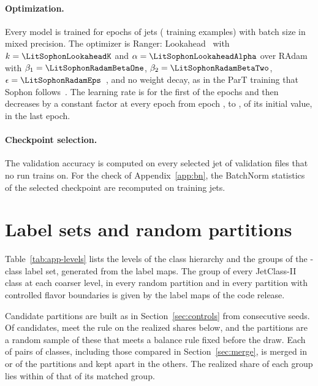 \documentclass[11pt]{article}
\newcommand{\Kcoarse}{\VocabSizeRonesixQone}
\begin{document}
\paragraph{Optimization.} Every model is trained for \DesignEpochs{} epochs of
\DesignSamplesPerEpoch{} jets (\DesignExamplesSeen{} training examples) with batch size
\DesignBatchSize{} in mixed precision. The optimizer is Ranger: Lookahead~\cite{lookahead}
with $k = \LitSophonLookaheadK$ and $\alpha = \LitSophonLookaheadAlpha$ over
RAdam~\cite{radam} with $\beta_1 = \LitSophonRadamBetaOne$,
$\beta_2 = \LitSophonRadamBetaTwo$, $\epsilon = \LitSophonRadamEps$~\cite[App.~B.1]{sophon}, and no
weight decay, as in the ParT training that Sophon follows~\cite{part}. The learning rate is \DesignStartLr{} for the first
\DesignLrFlatPercent{} of the epochs and then decreases by a constant factor at every epoch
from epoch \DesignLrDecayFirstEpoch, to \DesignEndLr, \DesignLrEndPercent{} of its initial
value, in the last epoch.

\paragraph{Checkpoint selection.} The validation accuracy is computed on every selected
jet of \DesignVtwoNValFiles{} validation files that no run trains on. For the check of
Appendix~\ref{app:bn}, the BatchNorm statistics of the selected checkpoint are recomputed
on \DesignBnJets{} training jets.

\section{Label sets and random partitions}\label{app:vocab}

Table~\ref{tab:app-levels} lists the levels of the class hierarchy and the groups of the
\Kcoarse-class label set, generated from the label maps. The group of every JetClass-II class at
each coarser level, in every random partition and in every partition with controlled flavor
boundaries is given by the label maps of the code release.

Candidate partitions are built as in Section~\ref{sec:controls} from consecutive seeds. Of
\RandVtwoPoolDraws{} candidates, \RandVtwoPoolPass{} meet the rule on the realized shares below,
and the \RandVtwoNPartitions{} partitions are a random sample of these that meets a balance rule
fixed before the draw. Each of
\RandVtwoNPairs{} pairs of classes, including those compared in Section~\ref{sec:merge}, is
merged in \RandVtwoMergedMin{} or \RandVtwoMergedMax{} of the partitions and kept apart in the
others. The realized share of each group lies within \RandVtwoShareTol{} of that of its
matched group.
\end{document}
